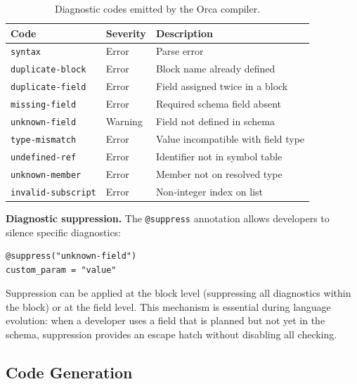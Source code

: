 \documentclass[sigconf,nonacm]{acmart}
\begin{document}
\begin{table}[t]
\caption{Diagnostic codes emitted by the Orca compiler.}
\label{tab:diagnostics}
\centering
\small
\begin{tabular}{@{}lll@{}}
\toprule
\textbf{Code} & \textbf{Severity} & \textbf{Description} \\
\midrule
\texttt{syntax}            & Error   & Parse error \\
\texttt{duplicate-block}   & Error   & Block name already defined \\
\texttt{duplicate-field}   & Error   & Field assigned twice in a block \\
\texttt{missing-field}     & Error   & Required schema field absent \\
\texttt{unknown-field}     & Warning & Field not defined in schema \\
\texttt{type-mismatch}     & Error   & Value incompatible with field type \\
\texttt{undefined-ref}     & Error   & Identifier not in symbol table \\
\texttt{unknown-member}    & Error   & Member not on resolved type \\
\texttt{invalid-subscript} & Error   & Non-integer index on list \\
\bottomrule
\end{tabular}
\end{table}

\noindent\textbf{Diagnostic suppression.} The \texttt{@suppress}
annotation allows developers to silence specific diagnostics:

\begin{lstlisting}
@suppress("unknown-field")
custom_param = "value"
\end{lstlisting}

Suppression can be applied at the block level (suppressing all diagnostics
within the block) or at the field level. This mechanism is essential during
language evolution: when a developer uses a field that is planned but not
yet in the schema, suppression provides an escape hatch without disabling
all checking.

\subsection{Code Generation}
\label{sec:compiler:codegen}
\end{document}
